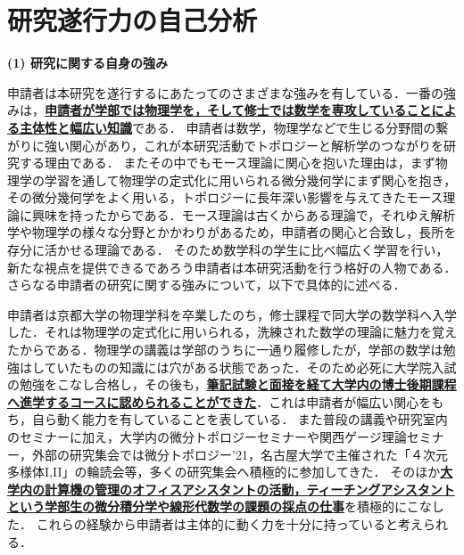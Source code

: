 \documentclass[11pt,a4j,dvipdfmx]{jarticle} 					%
\newcommand{\研究課題名}{象の卵}
\newcommand{\研究機関名}{京都大学}
\newcommand{\研究代表者氏名}{福士　謙二　　　}
\begin{document}




\section{研究遂行力の自己分析}


\noindent
\textbf{(1) 研究に関する自身の強み}

申請者は本研究を遂行するにあたってのさまざまな強みを有している．一番の強みは，\textbf{\ul{申請者が学部では物理学を，そして修士では数学を専攻していることによる主体性と幅広い知識}}である．
申請者は数学，物理学などで生じる分野間の繋がりに強い関心があり，これが本研究活動でトポロジーと解析学のつながりを研究する理由である．
またその中でもモース理論に関心を抱いた理由は，まず物理学の学習を通して物理学の定式化に用いられる微分幾何学にまず関心を抱き，その微分幾何学をよく用いる，トポロジーに長年深い影響を与えてきたモース理論に興味を持ったからである．モース理論は古くからある理論で，それゆえ解析学や物理学の様々な分野とかかわりがあるため，申請者の関心と合致し，長所を存分に活かせる理論である．
そのため数学科の学生に比べ幅広く学習を行い，新たな視点を提供できるであろう申請者は本研究活動を行う格好の人物である．
さらなる申請者の研究に関する強みについて，以下で具体的に述べる．


\noindent
{}

申請者は京都大学の物理学科を卒業したのち，修士課程で同大学の数学科へ入学した．それは物理学の定式化に用いられる，洗練された数学の理論に魅力を覚えたからである．物理学の講義は学部のうちに一通り履修したが，学部の数学は勉強はしていたものの知識には穴がある状態であった．そのため必死に大学院入試の勉強をこなし合格し，その後も，\textbf{\ul{筆記試験と面接を経て大学内の博士後期課程へ進学するコースに認められることができた}}．これは申請者が幅広い関心をもち，自ら動く能力を有していることを表している．
また普段の講義や研究室内のセミナーに加え，大学内の微分トポロジーセミナーや関西ゲージ理論セミナー，外部の研究集会では微分トポロジー'21，名古屋大学で主催された「４次元多様体I,II」の輪読会等，多くの研究集会へ積極的に参加してきた．
そのほか\textbf{\ul{大学内の計算機の管理のオフィスアシスタントの活動，ティーチングアシスタントという学部生の微分積分学や線形代数学の課題の採点の仕事}}を積極的にこなした．
これらの経験から申請者は主体的に動く力を十分に持っていると考えられる．
\end{document}
